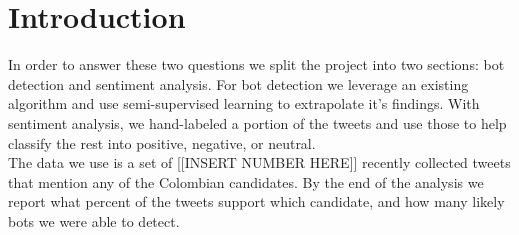 \documentclass[10pt,a4paper]{article} %
\begin{document}
	\pagestyle{plain}
	\title{\rmfamily\normalfont{}}
	\author{ \\ }
	\date{} %
	
	\maketitle
	
	\begin{abstract}
		\noindent Between May and June of 2018 the people of Colombia will vote for their next president.  As with any modern election, people are using Twitter, the social media platform, to support candidates they like, discredit the others, and debate who should win.  Twitter provides a massive open forum to create dialogue across the country.  Some groups take advantage of this by creating \textit{social bots}, which automatically post political tweets to in an attempt to sway votors \cite{swaine_2018}.  In our project, we use the text mining skills gained in this course to assess the influence of these bots.  We hope to answer two questions: how many bots are there and who are they supporting?
		
	\end{abstract}
	
	\section{Introduction}
		In order to answer these two questions we split the project into two sections:  bot detection and sentiment analysis.  For bot detection we leverage an existing algorithm and use semi-supervised learning to extrapolate it's findings.  With sentiment analysis, we hand-labeled a portion of the tweets and use those to help classify the rest into positive, negative, or neutral. \\
		
		\noindent The data we use is a set of [[INSERT NUMBER HERE]] recently collected tweets that mention any of the Colombian candidates.  By the end of the analysis we report what percent of the tweets support which candidate, and how many likely bots we were able to detect.
\end{document}
